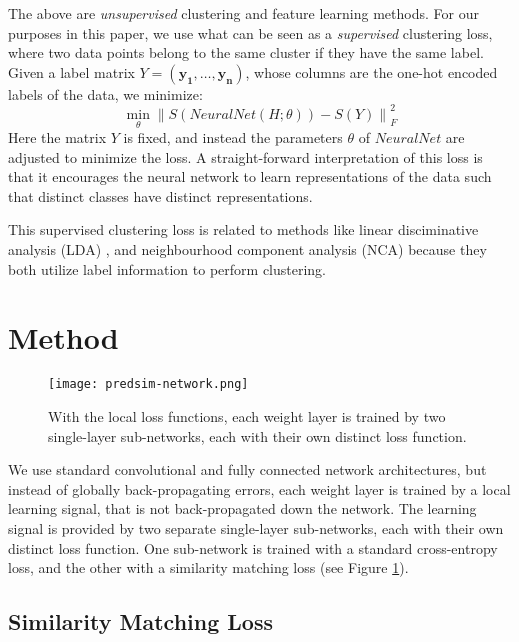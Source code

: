 \documentclass{article}
\begin{document}
The above are \textit{unsupervised} clustering and feature learning methods. For our purposes in this paper, we use what can be seen as a \textit{supervised} clustering loss, where two data points belong to the same cluster if they have the same label. Given a label matrix $Y=(\mathbf{y_1},\ldots,\mathbf{y_n})$, whose columns are the one-hot encoded labels of the data, we minimize:
\begin{equation}                                            
\min_{\theta} \left \| S(NeuralNet(H; \theta)) - S(Y) \right \|^2_F
\end{equation}
Here the matrix $Y$ is fixed, and instead the parameters $\theta$ of $NeuralNet$ are adjusted to minimize the loss. A straight-forward interpretation of this loss is that it encourages the neural network to learn representations of the data such that distinct classes have distinct representations.

This supervised clustering loss is related to methods like linear disciminative analysis (LDA) \cite{Fisher36}, and neighbourhood component analysis (NCA) \cite{GoldbergerHSS05} because they both utilize label information to perform clustering.

\section{Method}

\begin{figure}[h]
  \texttt{[image: predsim-network.png]}
  \caption{With the local loss functions, each weight layer is trained by two single-layer sub-networks, each with their own distinct loss function.}
  \label{fig:predsimnet}
\end{figure}

We use standard convolutional and fully connected network architectures, but instead of globally back-propagating errors, each weight layer is trained by a local learning signal, that is not back-propagated down the network. The learning signal is provided by two separate single-layer sub-networks, each with their own distinct loss function. One sub-network is trained with a standard cross-entropy loss, and the other with a similarity matching loss (see Figure \ref{fig:predsimnet}).

\subsection{Similarity Matching Loss}
 
\end{document}
